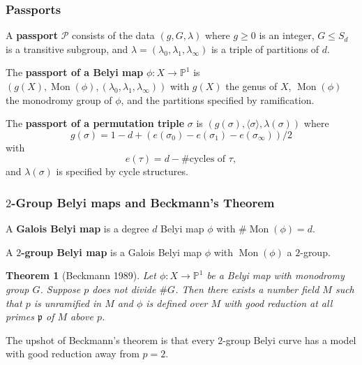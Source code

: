 \documentclass[handout, xcolor=dvipsnames]{beamer}
\DeclareMathOperator{\Mon}{Mon}
\theoremstyle{plain}
\newtheorem*{thm}{Theorem}
\newtheorem*{cor}{Corollary}
\newcommand{\PP}{\mathbb P}
\begin{document}
  \begin{frame}[plain]
    \frametitle{Passports}
    A \textbf{passport} $\mathcal{P}$ consists of the data
    $(g,G,\lambda)$ where $g\geq 0$ is an integer,
    $G\leq S_d$ is a transitive subgroup,
    and $\lambda = (\lambda_0,\lambda_1,\lambda_\infty)$
    is a triple of partitions of $d$.
    \pause
    \par
    The \textbf{passport of a Belyi map} $\phi:X\to\PP^1$
    is $(g(X), \Mon(\phi), (\lambda_0,\lambda_1,\lambda_\infty))$
    with $g(X)$ the genus of $X$,
    $\Mon(\phi)$ the monodromy group of $\phi$,
    and the partitions specified by ramification.
    \pause
    \par
    The \textbf{passport of a permutation triple} $\sigma$ is
    $(g(\sigma), \langle\sigma\rangle, \lambda(\sigma))$
    where
    $$
    g(\sigma) = 1-d+(e(\sigma_0)-e(\sigma_1)-e(\sigma_\infty))/2
    $$
    with
    $$
    e(\tau) = d-\#\text{cycles of }\tau,
    $$
    and $\lambda(\sigma)$ is specified by cycle structures.
  \end{frame}
  \begin{frame}[plain]
    \frametitle{$2$-Group Belyi maps and Beckmann's Theorem}
    A \textbf{Galois Belyi map} is a degree $d$ Belyi map $\phi$
    with $\#\Mon(\phi) = d$.
    \pause
    \par
    A \textbf{$2$-group Belyi map} is a Galois Belyi map $\phi$
    with $\Mon(\phi)$ a $2$-group.
    \pause
    \begin{thm}[Beckmann 1989]
      Let $\phi:X\to\PP^1$ be a Belyi map with monodromy group $G$.
      Suppose $p$ does not divide $\#G$.
      Then there exists a number field $M$ such that $p$
      is unramified in $M$ and
      $\phi$ is defined over $M$ with good reduction at all
      primes $\mathfrak{p}$ of $M$ above $p$.
    \end{thm}
    \pause
    The upshot of Beckmann's theorem
    is that every $2$-group Belyi curve has a model with
    good reduction away from $p=2$.
  \end{frame}
\end{document}
